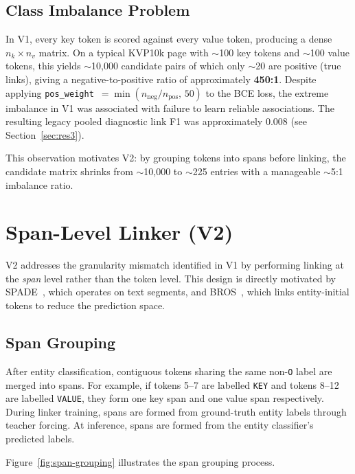 \subsection{Class Imbalance Problem}
\label{sec:v1-imbalance}

In V1, every key token is scored against every value token, producing a dense
$n_k \times n_v$ matrix. On a typical KVP10k page with $\sim$100 key tokens
and $\sim$100 value tokens, this yields $\sim$10{,}000 candidate pairs of
which only $\sim$20 are positive (true links), giving a negative-to-positive
ratio of approximately \textbf{450:1}. Despite applying
\texttt{pos\_weight}~$= \min(n_{\text{neg}}/n_{\text{pos}},\, 50)$ to the
BCE loss, the extreme imbalance in V1 was associated with failure to learn
reliable associations. The resulting legacy pooled diagnostic link F1 was
approximately $0.008$ (see
Section~\ref{sec:res3}).

This observation motivates V2: by grouping tokens into spans before linking,
the candidate matrix shrinks from $\sim$10{,}000 to $\sim$225 entries with
a manageable $\sim$5:1 imbalance ratio.

\section{Span-Level Linker (V2)}
\label{sec:v2-span-linking}

V2 addresses the granularity mismatch identified in V1 by performing linking
at the \emph{span} level rather than the token level. This design is directly
motivated by SPADE~\cite{spade}, which operates on text segments, and
BROS~\cite{bros}, which links entity-initial tokens to reduce the prediction
space.

\subsection{Span Grouping}
\label{sec:span-grouping}

After entity classification, contiguous tokens sharing the same non-\texttt{O}
label are merged into spans. For example, if tokens 5--7 are labelled
\texttt{KEY} and tokens 8--12 are labelled \texttt{VALUE}, they form one key
span and one value span respectively. During linker training, spans are formed
from ground-truth entity labels through teacher forcing. At inference, spans
are formed from the entity classifier's predicted labels.

Figure~\ref{fig:span-grouping} illustrates the span grouping process.

